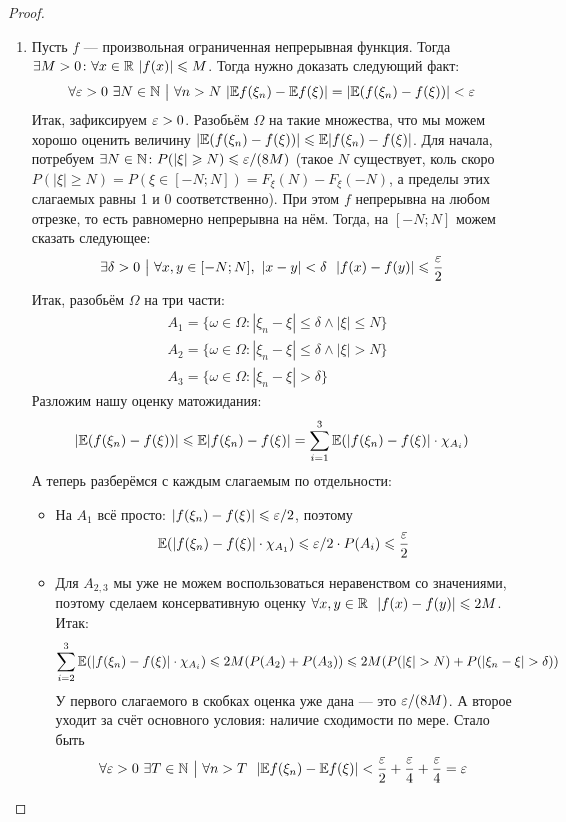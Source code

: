 \begin{proof}
\begin{enumerate}
		\item Пусть $f$ --- произвольная ограниченная непрерывная функция. Тогда $\exists M > 0 \colon \forall x \in \mathbb{R}\ |f(x)| \leqslant M$. Тогда нужно доказать следующий факт:
		\[
			\forall \varepsilon > 0\ \exists N \in \mathbb{N} \ \big|\  \forall n > N\ |\mathbb{E} f(\xi_n) - \mathbb{E} f(\xi)| = |\mathbb{E}(f(\xi_n) - f(\xi))| < \varepsilon
		\]
		Итак, зафиксируем $\varepsilon > 0$. Разобьём $\Omega$ на такие множества, что мы можем хорошо оценить величину $|\mathbb{E}(f(\xi_n) - f(\xi))| \leqslant \mathbb{E}|f(\xi_n) - f(\xi)|$. Для начала, потребуем $\exists N \in \mathbb{N} \colon P(|\xi| \geqslant N) \leqslant \varepsilon / (8M)$ (такое $N$ существует, коль скоро $P(|\xi| \ge N) = P(\xi \in [-N; N]) = F_\xi(N) - F_\xi(-N)$, а пределы этих слагаемых равны 1 и 0 соответственно). При этом $f$ непрерывна на любом отрезке, то есть равномерно непрерывна на нём. Тогда, на $[-N; N]$ можем сказать следующее:
		\[
			\exists \delta > 0 \ \big|\  \forall x, y \in [-N; N],\ |x - y| < \delta\ \ |f(x) - f(y)| \leqslant \frac{\varepsilon}{2}
		\]
		Итак, разобьём $\Omega$ на три части:
		\begin{align*}
			&{A_1 = \{\omega \in \Omega \colon |\xi_n - \xi| \le \delta \wedge |\xi| \le N\}}
			\\
			&{A_2 = \{\omega \in \Omega \colon |\xi_n - \xi| \le \delta \wedge |\xi| > N\}}
			\\
			&{A_3 = \{\omega \in \Omega \colon |\xi_n - \xi| > \delta\}}
		\end{align*}
		Разложим нашу оценку матожидания:
		\[
			|\mathbb{E} (f(\xi_n) - f(\xi))| \leqslant \mathbb{E}|f(\xi_n) - f(\xi)| = \sum_{i = 1}^3 \mathbb{E}(|f(\xi_n) - f(\xi)| \cdot \chi_{A_i})
		\]
		А теперь разберёмся с каждым слагаемым по отдельности:
		\begin{itemize}
			\item На $A_1$ всё просто: $|f(\xi_n) - f(\xi)| \leqslant \varepsilon / 2$, поэтому
			\[
				\mathbb{E}(|f(\xi_n) - f(\xi)| \cdot \chi_{A_1}) \leqslant \varepsilon / 2 \cdot P(A_i) \leqslant \frac{\varepsilon}{2}
			\]
			
			\item Для $A_{2, 3}$ мы уже не можем воспользоваться неравенством со значениями, поэтому сделаем консервативную оценку $\forall x, y \in \mathbb{R}\ \ |f(x) - f(y)| \leqslant 2M$. Итак:
			\[
				\sum_{i = 2}^3 \mathbb{E}(|f(\xi_n) - f(\xi)| \cdot \chi_{A_i}) \leqslant 2M(P(A_2) + P(A_3)) \leqslant 2M(P(|\xi| > N) + P(|\xi_n - \xi| > \delta))
			\]
			У первого слагаемого в скобках оценка уже дана --- это $\varepsilon / (8M)$. А второе уходит за счёт основного условия: наличие сходимости по мере. Стало быть
			\[
				\forall \varepsilon > 0\ \exists T \in \mathbb{N} \ \big|\  \forall n > T\ \ |\mathbb{E} f(\xi_n) - \mathbb{E} f(\xi)| < \frac{\varepsilon}{2} + \frac{\varepsilon}{4} + \frac{\varepsilon}{4} = \varepsilon
			\]
		\end{itemize}
	\end{enumerate}
\end{proof}

